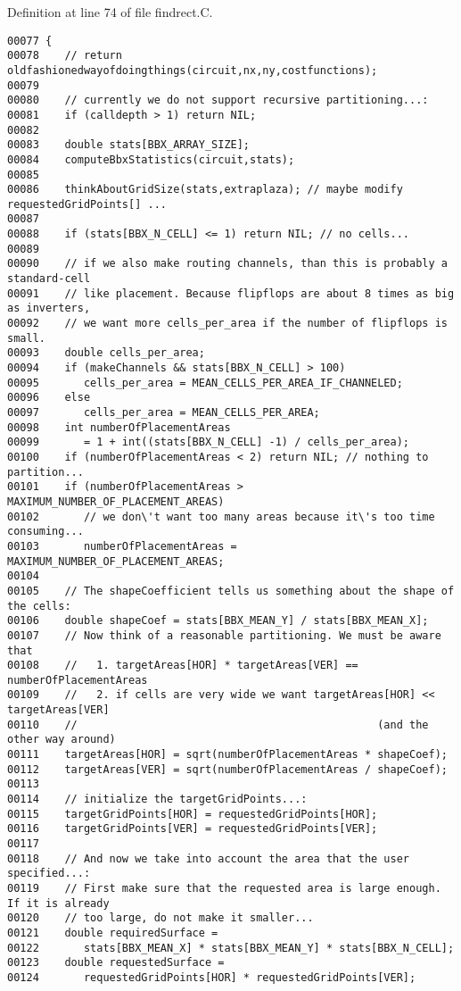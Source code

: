 Definition at line 74 of file findrect.C.\small\begin{verbatim}00077 {
00078    // return oldfashionedwayofdoingthings(circuit,nx,ny,costfunctions);
00079 
00080    // currently we do not support recursive partitioning...:
00081    if (calldepth > 1) return NIL;
00082 
00083    double stats[BBX_ARRAY_SIZE];
00084    computeBbxStatistics(circuit,stats);
00085 
00086    thinkAboutGridSize(stats,extraplaza); // maybe modify requestedGridPoints[] ...
00087 
00088    if (stats[BBX_N_CELL] <= 1) return NIL; // no cells...
00089 
00090    // if we also make routing channels, than this is probably a standard-cell
00091    // like placement. Because flipflops are about 8 times as big as inverters,
00092    // we want more cells_per_area if the number of flipflops is small.
00093    double cells_per_area;
00094    if (makeChannels && stats[BBX_N_CELL] > 100)
00095       cells_per_area = MEAN_CELLS_PER_AREA_IF_CHANNELED;
00096    else
00097       cells_per_area = MEAN_CELLS_PER_AREA;
00098    int numberOfPlacementAreas
00099       = 1 + int((stats[BBX_N_CELL] -1) / cells_per_area);
00100    if (numberOfPlacementAreas < 2) return NIL; // nothing to partition...
00101    if (numberOfPlacementAreas > MAXIMUM_NUMBER_OF_PLACEMENT_AREAS)
00102       // we don\'t want too many areas because it\'s too time consuming...
00103       numberOfPlacementAreas = MAXIMUM_NUMBER_OF_PLACEMENT_AREAS;
00104 
00105    // The shapeCoefficient tells us something about the shape of the cells:
00106    double shapeCoef = stats[BBX_MEAN_Y] / stats[BBX_MEAN_X];
00107    // Now think of a reasonable partitioning. We must be aware that
00108    //   1. targetAreas[HOR] * targetAreas[VER] == numberOfPlacementAreas
00109    //   2. if cells are very wide we want targetAreas[HOR] << targetAreas[VER]
00110    //                                               (and the other way around)
00111    targetAreas[HOR] = sqrt(numberOfPlacementAreas * shapeCoef);
00112    targetAreas[VER] = sqrt(numberOfPlacementAreas / shapeCoef);
00113 
00114    // initialize the targetGridPoints...:
00115    targetGridPoints[HOR] = requestedGridPoints[HOR];
00116    targetGridPoints[VER] = requestedGridPoints[VER];
00117 
00118    // And now we take into account the area that the user specified...:
00119    // First make sure that the requested area is large enough. If it is already
00120    // too large, do not make it smaller...
00121    double requiredSurface =
00122       stats[BBX_MEAN_X] * stats[BBX_MEAN_Y] * stats[BBX_N_CELL];
00123    double requestedSurface =
00124       requestedGridPoints[HOR] * requestedGridPoints[VER];

\end{verbatim}
